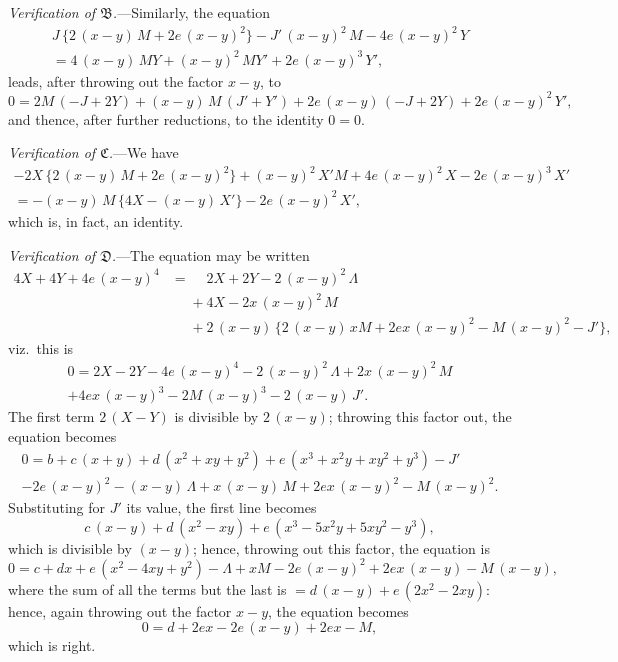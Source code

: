 \documentclass[12pt,a4paper]{article}
\begin{document}
\textit{Verification of $\mathfrak{B}$.}---Similarly, the equation
\begin{multline*}
J\,\{2\,(x-y)\,M + 2e\,(x-y)^2\} - J'\,(x-y)^2\,M - 4e\,(x-y)^2\,Y \\
= 4\,(x-y)\,MY + (x-y)^2\,MY' + 2e\,(x-y)^3\,Y',
\end{multline*}
leads, after throwing out the factor $x-y$, to
\[
0 = 2M\,(-J+2Y) + (x-y)\,M\,(J'+Y') + 2e\,(x-y)\,(-J+2Y) + 2e\,(x-y)^2\,Y',
\]
and thence, after further reductions, to the identity $0=0$.

\vspace{2ex}
\noindent\textit{Verification of $\mathfrak{C}$.}---We have
\begin{multline*}
-2X\,\{2\,(x-y)\,M + 2e\,(x-y)^2\} + (x-y)^2\,X'M + 4e\,(x-y)^2\,X - 2e\,(x-y)^3\,X' \\
= -(x-y)\,M\,\{4X - (x-y)\,X'\} - 2e\,(x-y)^2\,X',
\end{multline*}
which is, in fact, an identity.

\textit{Verification of $\mathfrak{D}$.}---The equation may be written
\begin{align*}
4X + 4Y + 4e\,(x-y)^4 &= \phantom{+}2X + 2Y - 2\,(x-y)^2\,\Lambda \\
&\phantom{=} + 4X - 2x\,(x-y)^2\,M \\
&\phantom{=} + 2\,(x-y)\,\{2\,(x-y)\,xM + 2ex\,(x-y)^2 - M\,(x-y)^2 - J'\},
\end{align*}
viz.\ this is
\begin{multline*}
0 = 2X - 2Y - 4e\,(x-y)^4 - 2\,(x-y)^2\,\Lambda + 2x\,(x-y)^2\,M \\
+ 4ex\,(x-y)^3 - 2M\,(x-y)^3 - 2\,(x-y)\,J'.
\end{multline*}
The first term $2\,(X-Y)$ is divisible by $2\,(x-y)$; throwing this factor out, the equation becomes
\begin{multline*}
0 = b + c\,(x+y) + d\,(x^2+xy+y^2) + e\,(x^3+x^2y+xy^2+y^3) - J' \\
- 2e\,(x-y)^2 - (x-y)\,\Lambda + x\,(x-y)\,M + 2ex\,(x-y)^2 - M\,(x-y)^2.
\end{multline*}
Substituting for $J'$ its value, the first line becomes
\[
c\,(x-y) + d\,(x^2-xy) + e\,(x^3-5x^2y+5xy^2-y^3),
\]
which is divisible by $(x-y)$; hence, throwing out this factor, the equation is
\[
0 = c + dx + e\,(x^2-4xy+y^2) - \Lambda + xM - 2e\,(x-y)^2 + 2ex\,(x-y) - M\,(x-y),
\]
where the sum of all the terms but the last is $= d\,(x-y) + e\,(2x^2-2xy)$: hence, again throwing out the factor $x-y$, the equation becomes
\[
0 = d + 2ex - 2e\,(x-y) + 2ex - M,
\]
which is right.
\end{document}
